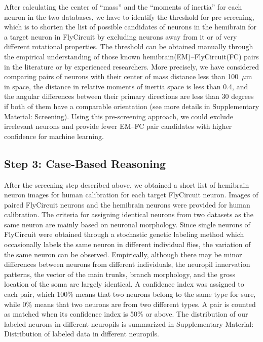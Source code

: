 \documentclass[10pt,a4paper]{article}
\begin{document}
After calculating the center of ``mass'' and the ``moments of inertia'' for each
neuron in the two databases, we have to identify the threshold for
pre-screening, which is to shorten the list of possible candidates of neurons in
the hemibrain for a target neuron in FlyCircuit by excluding neurons away from
it or of very different rotational properties. The threshold can be obtained
manually through the empirical understanding of those known hemibrain(EM)--FlyCircuit(FC) pairs in the
literature or by experienced researchers. More precisely, we have
considered comparing pairs of neurons with their center of mass distance less
than 100~$\mu$m in space, the distance in relative moments of inertia space is
less than 0.4, and the angular differences between their primary directions are less than 30 degrees if both of them have a comparable orientation (see more details in Supplementary Material: Screening). Using
this pre-screening approach, we could exclude irrelevant neurons and provide
fewer EM--FC pair candidates with higher confidence for machine learning.

\subsection*{Step 3: Case-Based Reasoning}

After the screening step described above, we obtained a short list of hemibrain
neuron images for human calibration for each target FlyCircuit neuron. Images of
paired FlyCircuit neurons and the hemibrain neurons were provided for human
calibration. The criteria for assigning identical neurons from two datasets as
the same neuron are mainly based on neuronal morphology. Since single neurons of
FlyCircuit were obtained through a stochastic genetic labeling method which
occasionally labels the same neuron in different individual flies, the variation
of the same neuron can be observed. Empirically, although there may be minor
differences between neurons from different individuals, the neuropil innervation
patterns, the vector of the main trunks, branch morphology, and the gross
location of the soma are largely identical. A confidence index was assigned to
each pair, which 100\% means that two neurons belong to the same type for sure,
while 0\% means that two neurons are from two different types. A pair is counted
as matched when its confidence index is 50\% or above. The
distribution of our labeled neurons in different neuropils is summarized in
Supplementary Material: Distribution of labeled data in different neuropils.
\end{document}
